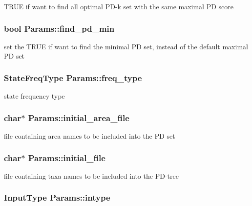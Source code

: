 \label{structParams_ae91712db78b9355a45eb1f1d4301c6c3}
TRUE if want to find all optimal PD-\/k set with the same maximal PD score \hypertarget{structParams_a021b7ee8df12237dae17cd4572f5f4db}{
\subsubsection[{find\_\-pd\_\-min}]{\setlength{\rightskip}{0pt plus 5cm}bool {\bf Params::find\_\-pd\_\-min}}}
\label{structParams_a021b7ee8df12237dae17cd4572f5f4db}
set the TRUE if want to find the minimal PD set, instead of the default maximal PD set \hypertarget{structParams_aa7578d1989c15917667f77c5def68e88}{
\subsubsection[{freq\_\-type}]{\setlength{\rightskip}{0pt plus 5cm}StateFreqType {\bf Params::freq\_\-type}}}
\label{structParams_aa7578d1989c15917667f77c5def68e88}
state frequency type \hypertarget{structParams_a13862fabd178533e46d5f5e4111d2abc}{
\subsubsection[{initial\_\-area\_\-file}]{\setlength{\rightskip}{0pt plus 5cm}char$\ast$ {\bf Params::initial\_\-area\_\-file}}}
\label{structParams_a13862fabd178533e46d5f5e4111d2abc}
file containing area names to be included into the PD set \hypertarget{structParams_a709f1c5dcb82385904014373d459f3cf}{
\subsubsection[{initial\_\-file}]{\setlength{\rightskip}{0pt plus 5cm}char$\ast$ {\bf Params::initial\_\-file}}}
\label{structParams_a709f1c5dcb82385904014373d459f3cf}
file containing taxa names to be included into the PD-\/tree \hypertarget{structParams_a3a37fea06df61c82fc8079ed54256d21}{
\subsubsection[{intype}]{\setlength{\rightskip}{0pt plus 5cm}InputType {\bf Params::intype}}}
